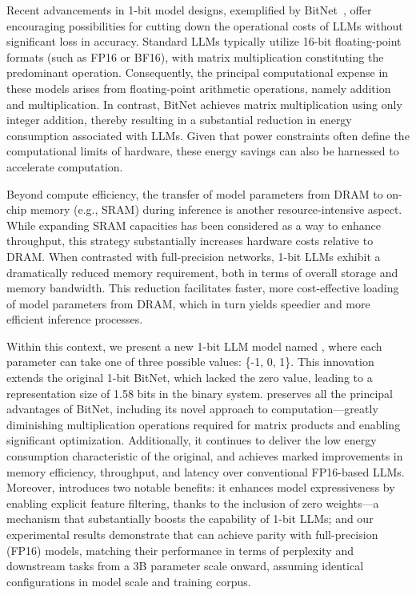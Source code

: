 Recent advancements in 1-bit model designs, exemplified by BitNet~\cite{bitnet}, offer encouraging possibilities for cutting down the operational costs of LLMs without significant loss in accuracy. Standard LLMs typically utilize 16-bit floating-point formats (such as FP16 or BF16), with matrix multiplication constituting the predominant operation. Consequently, the principal computational expense in these models arises from floating-point arithmetic operations, namely addition and multiplication. In contrast, BitNet achieves matrix multiplication using only integer addition, thereby resulting in a substantial reduction in energy consumption associated with LLMs. Given that power constraints often define the computational limits of hardware, these energy savings can also be harnessed to accelerate computation.

Beyond compute efficiency, the transfer of model parameters from DRAM to on-chip memory (e.g., SRAM) during inference is another resource-intensive aspect. While expanding SRAM capacities has been considered as a way to enhance throughput, this strategy substantially increases hardware costs relative to DRAM. When contrasted with full-precision networks, 1-bit LLMs exhibit a dramatically reduced memory requirement, both in terms of overall storage and memory bandwidth. This reduction facilitates faster, more cost-effective loading of model parameters from DRAM, which in turn yields speedier and more efficient inference processes.

Within this context, we present a new 1-bit LLM model named \textbf{}, where each parameter can take one of three possible values: \{-1, 0, 1\}. This innovation extends the original 1-bit BitNet, which lacked the zero value, leading to a representation size of 1.58 bits in the binary system.  preserves all the principal advantages of BitNet, including its novel approach to computation—greatly diminishing multiplication operations required for matrix products and enabling significant optimization. Additionally, it continues to deliver the low energy consumption characteristic of the original, and achieves marked improvements in memory efficiency, throughput, and latency over conventional FP16-based LLMs. Moreover,  introduces two notable benefits: it enhances model expressiveness by enabling explicit feature filtering, thanks to the inclusion of zero weights—a mechanism that substantially boosts the capability of 1-bit LLMs; and our experimental results demonstrate that  can achieve parity with full-precision (FP16) models, matching their performance in terms of perplexity and downstream tasks from a 3B parameter scale onward, assuming identical configurations in model scale and training corpus.

